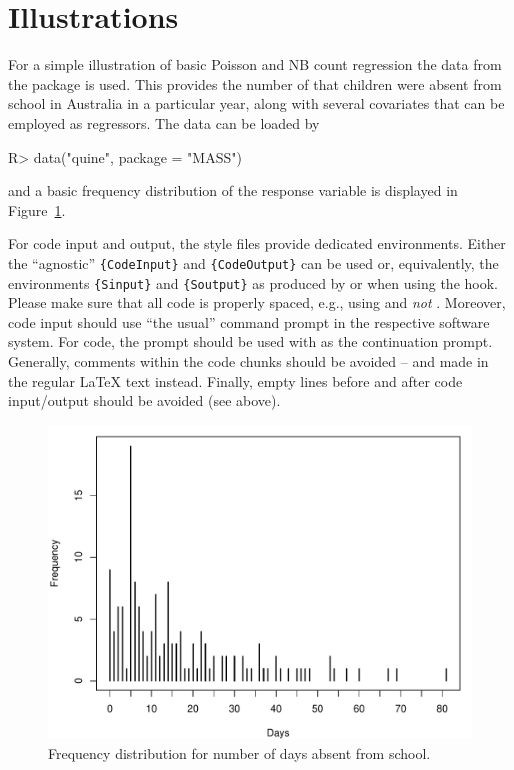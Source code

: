 \documentclass[article]{jss}
\newcommand{\fct}[1]{\code{#1()}}
\begin{document}
\section{Illustrations} \label{sec:illustrations}

For a simple illustration of basic Poisson and NB count regression the
 data from the  package is used. This provides the number
of  that children were absent from school in Australia in a
particular year, along with several covariates that can be employed as regressors.
The data can be loaded by
%
\begin{CodeChunk}
\begin{CodeInput}
R> data("quine", package = "MASS")
\end{CodeInput}
\end{CodeChunk}
%
and a basic frequency distribution of the response variable is displayed in
Figure~\ref{fig:quine}.

\begin{leftbar}
For code input and output, the style files provide dedicated environments.
Either the ``agnostic'' \verb|{CodeInput}| and \verb|{CodeOutput}| can be used
or, equivalently, the environments \verb|{Sinput}| and \verb|{Soutput}| as
produced by \fct{Sweave} or  when using the 
hook. Please make sure that all code is properly spaced, e.g., using
 and \emph{not} . Moreover, code input should
use ``the usual'' command prompt in the respective software system. For
 code, the prompt  should be used with  as
the continuation prompt. Generally, comments within the code chunks should be
avoided -- and made in the regular {\LaTeX} text instead. Finally, empty lines
before and after code input/output should be avoided (see above).
\end{leftbar}

\begin{figure}[t!]
\centering
\includegraphics{article-visualization}
\caption{\label{fig:quine} Frequency distribution for number of days absent
from school.}
\end{figure}
\end{document}
